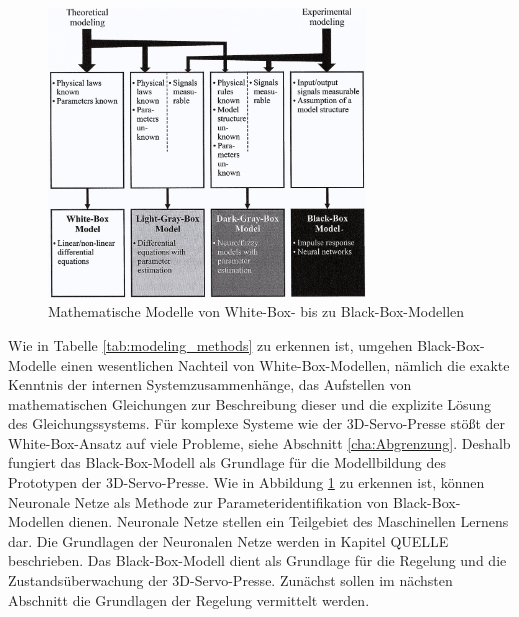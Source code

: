 \begin{figure} 
	\centering
	\includegraphics[width=0.75\textwidth]{images/modeling_methods}
	\caption{Mathematische Modelle von White-Box- bis zu Black-Box-Modellen \cite{Isermann.2011}}
	\label{fig:modeling_methods}
\end{figure}

Wie in Tabelle \ref{tab:modeling_methods} zu erkennen ist, umgehen Black-Box-Modelle einen wesentlichen Nachteil von White-Box-Modellen, nämlich die exakte Kenntnis der internen Systemzusammenhänge, das Aufstellen von mathematischen Gleichungen zur Beschreibung dieser und die explizite Lösung des Gleichungssystems. Für komplexe Systeme  wie der 3D-Servo-Presse stößt der White-Box-Ansatz auf viele Probleme, siehe Abschnitt \ref{cha:Abgrenzung}. 
Deshalb fungiert das Black-Box-Modell als Grundlage für die Modellbildung des Prototypen der 3D-Servo-Presse.  Wie in Abbildung \ref{fig:modeling_methods} zu erkennen ist, können  Neuronale Netze als Methode zur Parameteridentifikation von Black-Box-Modellen dienen. Neuronale Netze stellen ein Teilgebiet des Maschinellen Lernens dar. Die Grundlagen der Neuronalen Netze werden in Kapitel QUELLE beschrieben. Das Black-Box-Modell dient als Grundlage für die Regelung und die Zustandsüberwachung der 3D-Servo-Presse. Zunächst sollen im nächsten Abschnitt die Grundlagen der Regelung vermittelt werden. 












